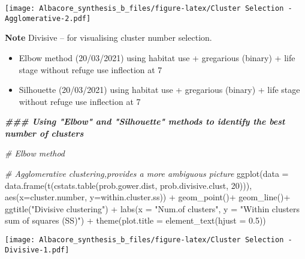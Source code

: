\documentclass[
]{article}
\newenvironment{Shaded}{\begin{snugshade}}{\end{snugshade}}
\newcommand{\AttributeTok}[1]{\textcolor[rgb]{0.77,0.63,0.00}{#1}}
\newcommand{\CommentTok}[1]{\textcolor[rgb]{0.56,0.35,0.01}{\textit{#1}}}
\newcommand{\DecValTok}[1]{\textcolor[rgb]{0.00,0.00,0.81}{#1}}
\newcommand{\DocumentationTok}[1]{\textcolor[rgb]{0.56,0.35,0.01}{\textbf{\textit{#1}}}}
\newcommand{\FloatTok}[1]{\textcolor[rgb]{0.00,0.00,0.81}{#1}}
\newcommand{\FunctionTok}[1]{\textcolor[rgb]{0.00,0.00,0.00}{#1}}
\newcommand{\NormalTok}[1]{#1}
\newcommand{\SpecialCharTok}[1]{\textcolor[rgb]{0.00,0.00,0.00}{#1}}
\newcommand{\StringTok}[1]{\textcolor[rgb]{0.31,0.60,0.02}{#1}}
\begin{document}
\texttt{[image: Albacore\_synthesis\_b\_files/figure-latex/Cluster Selection - Agglomerative-2.pdf]}

\textbf{Note} Divisive -- for visualising cluster number selection.

\begin{itemize}
\item
  Elbow method (20/03/2021) using habitat use + gregarious (binary) +
  life stage without refuge use inflection at 7
\item
  Silhouette (20/03/2021) using habitat use + gregarious (binary) + life
  stage without refuge use inflection at 7
\end{itemize}

\begin{Shaded}
\begin{Highlighting}[]
\DocumentationTok{\#\#\# Using "Elbow" and "Silhouette" methods to identify the best number of clusters}

\CommentTok{\# Elbow method}

\CommentTok{\# Agglomerative clustering,provides a more ambiguous picture}
\FunctionTok{ggplot}\NormalTok{(}\AttributeTok{data =} \FunctionTok{data.frame}\NormalTok{(}\FunctionTok{t}\NormalTok{(}\FunctionTok{cstats.table}\NormalTok{(prob.gower.dist, prob.divisive.clust, }\DecValTok{20}\NormalTok{))), }
       \FunctionTok{aes}\NormalTok{(}\AttributeTok{x=}\NormalTok{cluster.number, }\AttributeTok{y=}\NormalTok{within.cluster.ss)) }\SpecialCharTok{+} 
  \FunctionTok{geom\_point}\NormalTok{()}\SpecialCharTok{+}
  \FunctionTok{geom\_line}\NormalTok{()}\SpecialCharTok{+}
  \FunctionTok{ggtitle}\NormalTok{(}\StringTok{"Divisive clustering"}\NormalTok{) }\SpecialCharTok{+}
  \FunctionTok{labs}\NormalTok{(}\AttributeTok{x =} \StringTok{"Num.of clusters"}\NormalTok{, }\AttributeTok{y =} \StringTok{"Within clusters sum of squares (SS)"}\NormalTok{) }\SpecialCharTok{+}
  \FunctionTok{theme}\NormalTok{(}\AttributeTok{plot.title =} \FunctionTok{element\_text}\NormalTok{(}\AttributeTok{hjust =} \FloatTok{0.5}\NormalTok{))}
\end{Highlighting}
\end{Shaded}

\texttt{[image: Albacore\_synthesis\_b\_files/figure-latex/Cluster Selection - Divisive-1.pdf]}
\end{document}
